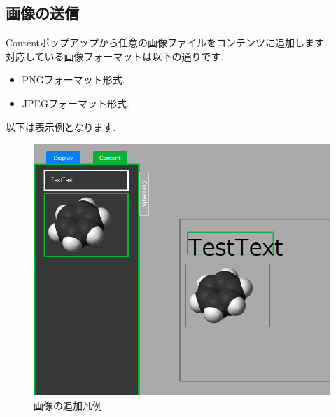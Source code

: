 \documentclass[a4paper,10pt,oneside]{jsbook}
\begin{document}
\newpage





\subsection{画像の送信}
Contentポップアップから任意の画像ファイルをコンテンツに追加します.\\
対応している画像フォーマットは以下の通りです.\\

\begin{itemize}
\item PNGフォーマット形式.
\item JPEGフォーマット形式.
\end{itemize}

以下は表示例となります.\\
\begin{figure}[htbp]
	\begin{center}
		\includegraphics[width=11.5cm]{image/AddContent_Picture_View.PNG}
	\end{center}
	\caption{画像の追加凡例}
	\label{fig:addimage}
\end{figure}



\newpage

\end{document}
